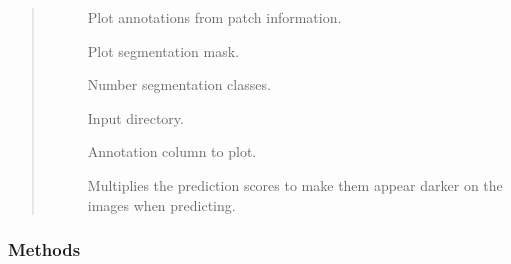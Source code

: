 \documentclass[letterpaper,10pt,english]{sphinxmanual}
\begin{document}
\begin{fulllineitems}
\begin{quote}
\begin{description}
\begin{description}
\item[{}] \leavevmode
Plot annotations from patch information.

\item[{}] \leavevmode
Plot segmentation mask.

\item[{}] \leavevmode
Number segmentation classes.

\item[{}] \leavevmode
Input directory.

\item[{}] \leavevmode
Annotation column to plot.

\item[{}] \leavevmode
Multiplies the prediction scores to make them appear darker on the images when predicting.

\end{description}

\end{description}\end{quote}
\subsubsection*{Methods}


\begin{savenotes}\sphinxatlongtablestart\begin{longtable}[c]{}
\hline

\endfirsthead

%
{}\\
\hline

\endhead

\hline
{}\\
\endfoot

\endlastfoot


\end{longtable}
\end{savenotes}
\end{fulllineitems}
\end{document}
